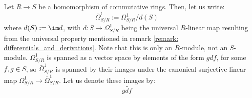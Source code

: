         \begin{convention} \label{conv: cyclic_1_forms}
            Let $R \to S$ be a homomorphism of commutative rings. Then, let us write:
                $$\bar{\Omega}^1_{S/R} := \Omega^1_{S/R}/d(S)$$
            where $d(S) := \im d$, with $d: S \to \Omega^1_{S/R}$ being the universal $R$-linear map resulting from the universal property mentioned in remark \ref{remark: differentials_and_derivations}. Note that this is only an $R$-module, not an $S$-module. $\Omega^1_{S/R}$ is spanned as a vector space by elements of the form $g df$, for some $f, g \in S$, so $\bar{\Omega}^1_{S/R}$ is spanned by their images under the canonical surjective linear map $\Omega^1_{S/R} \to \bar{\Omega}^1_{S/R}$. Let us denote these images by:
                $$g\bar{d}f$$
        \end{convention}


